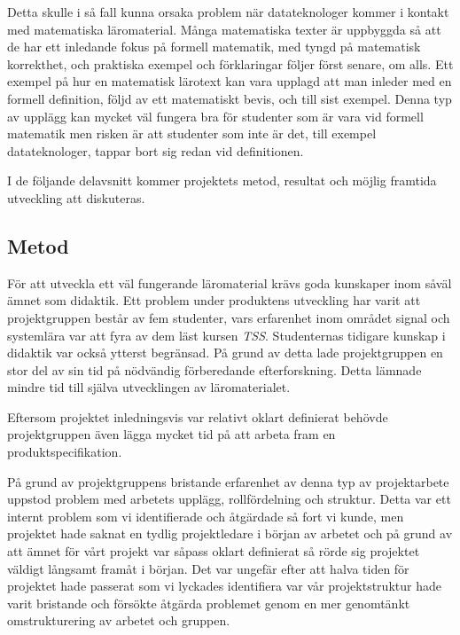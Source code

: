 \documentclass[]{article}
\begin{document}
Detta skulle i så fall kunna orsaka problem när datateknologer kommer i kontakt med matematiska läromaterial. Många 
matematiska texter är uppbyggda så att de har ett inledande fokus på formell matematik, med tyngd på matematisk 
korrekthet, och praktiska exempel och förklaringar följer först senare, om alls. Ett exempel på hur en matematisk 
lärotext kan vara upplagd att man inleder med en formell definition, följd av ett matematiskt bevis, och till sist 
exempel. Denna typ av upplägg kan mycket väl fungera bra för studenter som är vara vid formell matematik men risken är 
att studenter som inte är det, till exempel datateknologer, tappar bort sig redan vid definitionen.

I de följande delavsnitt kommer projektets metod, resultat och möjlig framtida utveckling att diskuteras.

\subsection{Metod}
För att utveckla ett väl fungerande läromaterial krävs goda kunskaper inom såväl ämnet som didaktik. Ett problem under 
produktens utveckling har varit att projektgruppen består av fem studenter, vars erfarenhet inom området signal och 
systemlära var att fyra av dem läst kursen \textit{TSS}. Studenternas tidigare kunskap i didaktik var också ytterst 
begränsad. På grund av detta lade projektgruppen en stor del av sin tid på nödvändig förberedande efterforskning. Detta 
lämnade mindre tid till själva utvecklingen av läromaterialet. 

Eftersom projektet inledningsvis var relativt oklart definierat behövde projektgruppen även lägga mycket tid på att 
arbeta fram en produktspecifikation. 

På grund av projektgruppens bristande erfarenhet av denna typ av projektarbete uppstod problem med arbetets upplägg, 
rollfördelning och struktur. Detta var ett internt problem som vi identifierade och åtgärdade så fort vi kunde, men 
projektet hade saknat en tydlig projektledare i början av arbetet och på grund av att ämnet för vårt projekt var såpass 
oklart definierat så rörde sig projektet väldigt långsamt framåt i början. Det var ungefär efter att halva tiden för 
projektet hade passerat som vi lyckades identifiera var vår projektstruktur hade varit bristande och försökte åtgärda 
problemet genom en mer genomtänkt omstrukturering av arbetet och gruppen.
\end{document}

